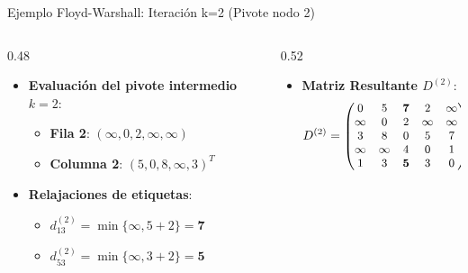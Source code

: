 \documentclass[
  ignorenonframetext,
]{beamer}
\providecommand{\tightlist}{%
  \setlength{\itemsep}{0pt}\setlength{\parskip}{0pt}}
\begin{document}
\begin{frame}{Ejemplo Floyd-Warshall: Iteración k=2 (Pivote nodo 2)}
\label{ejemplo-floyd-warshall-iteraciuxf3n-k2-pivote-nodo-2}
\begin{columns}[T]
\begin{column}{0.48\linewidth}
\begin{itemize}
\tightlist
\item
  \textbf{Evaluación del pivote intermedio \(k=2\)}:

  \begin{itemize}
  \tightlist
  \item
    \textbf{Fila 2}: \((\infty, 0, 2, \infty, \infty)\)
  \item
    \textbf{Columna 2}: \((5, 0, 8, \infty, 3)^T\)
  \end{itemize}
\item
  \textbf{Relajaciones de etiquetas}:

  \begin{itemize}
  \tightlist
  \item
    \(d_{13}^{(2)} = \min \{\infty, 5 + 2\} = \mathbf{7}\)
  \item
    \(d_{53}^{(2)} = \min \{\infty, 3 + 2\} = \mathbf{5}\)
  \end{itemize}
\end{itemize}
\end{column}

\begin{column}{0.52\linewidth}
\begin{itemize}
\tightlist
\item
  \textbf{Matriz Resultante \(D^{(2)}\)}: \[ \small
  D^{(2)} = \begin{pmatrix}
  0 & 5 & \mathbf{7} & 2 & \infty \\
  \infty & 0 & 2 & \infty & \infty \\
  3 & 8 & 0 & 5 & 7 \\
  \infty & \infty & 4 & 0 & 1 \\
  1 & 3 & \mathbf{5} & 3 & 0
  \end{pmatrix}
  \]
\end{itemize}
\end{column}
\end{columns}
\end{frame}
\end{document}
